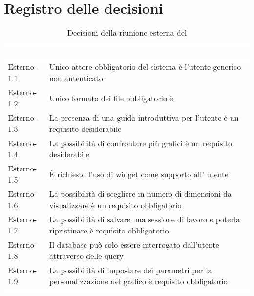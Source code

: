 \section{Registro delle decisioni}
{
\renewcommand{\arraystretch}{1.5}
\centering
\begin{longtable}{C{3cm} C{9cm}}
\textcolor{white}{\textbf{Codice}}&
\textcolor{white}{\textbf{Decisione}}\\	
\endhead
		
Esterno-1.1 & Unico attore obbligatorio del sistema è l'utente generico non autenticato\\

Esterno-1.2 & Unico formato dei file obbligatorio è \\

Esterno-1.3 & La presenza di una guida introduttiva per l'utente è un requisito desiderabile\\

Esterno-1.4 & La possibilità di confrontare più grafici è un requisito desiderabile\\

Esterno-1.5 & È richiesto l'uso di widget come supporto all' utente\\

Esterno-1.6 & La possibilità di scegliere in numero di dimensioni da visualizzare è un requisito obbligatorio\\

Esterno-1.7 & La possibilità di salvare una sessione di lavoro e poterla ripristinare è requisito obbligatorio\\

Esterno-1.8 & Il database può solo essere interrogato dall'utente attraverso delle query\\

Esterno-1.9 & La possibilità di impostare dei parametri per la personalizzazione del grafico è requisito obbligatorio\\

\caption{Decisioni della riunione esterna del \Data{}}
		
\end{longtable}
}
